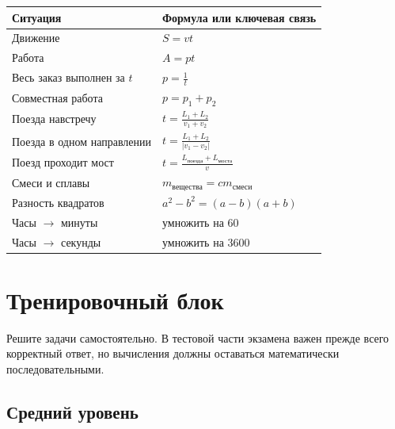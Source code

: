 \documentclass[a4paper,12pt]{article}
\begin{document}
\begin{table}[ht]
\centering
\renewcommand{\arraystretch}{1.45}
\begin{tabularx}{\linewidth}{Y Y}
\toprule
Ситуация & Формула или ключевая связь \\
\midrule
Движение &
\(\displaystyle S=vt\) \\

Работа &
\(\displaystyle A=pt\) \\

Весь заказ выполнен за \(t\) &
\(\displaystyle p=\frac1t\) \\

Совместная работа &
\(\displaystyle p=p_1+p_2\) \\

Поезда навстречу &
\(\displaystyle
t=\frac{L_1+L_2}{v_1+v_2}\) \\

Поезда в одном направлении &
\(\displaystyle
t=\frac{L_1+L_2}{|v_1-v_2|}\) \\

Поезд проходит мост &
\(\displaystyle
t=\frac{L_{\text{поезда}}+L_{\text{моста}}}{v}\) \\

Смеси и сплавы &
\(\displaystyle m_{\text{вещества}}=cm_{\text{смеси}}\) \\

Разность квадратов &
\(\displaystyle a^2-b^2=(a-b)(a+b)\) \\

Часы \(\to\) минуты &
умножить на \(60\) \\

Часы \(\to\) секунды &
умножить на \(3600\) \\
\bottomrule
\end{tabularx}
\end{table}


\clearpage

\section*{Тренировочный блок}

Решите задачи самостоятельно.
В тестовой части экзамена важен прежде всего корректный ответ,
но вычисления должны оставаться математически последовательными.

\subsection*{Средний уровень}
\end{document}
